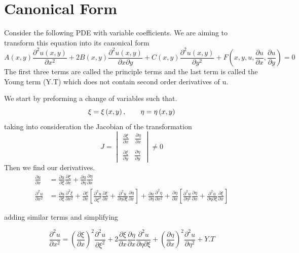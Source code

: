 \documentclass[]{article}
\begin{document}
\section{Canonical Form}
Consider the following PDE with variable coefficients. We are aiming to transform this equation into its canonical form
\begin{equation}
A\left(x,y\right)\frac{\partial^2 u\left(x,y\right)}{\partial x^2} + 2B\left(x,y\right)\frac{\partial^2 u\left(x,y\right)}{\partial x\partial y}+C\left(x,y\right)\frac{\partial^2 u\left(x,y\right)}{\partial y^2}+F\left(x,y,u,\frac{\partial u}{\partial x},\frac{\partial u}{\partial y}\right) = 0
\end{equation}
The first three terms are called the principle terms and the last term is called the Young term (Y.T) which does not contain second order derivatives of u.
\par
We start by preforming a change of variables such that.
\[
    \xi = \xi\left(x,y\right),\quad\quad \eta = \eta\left(x,y\right)    
\]
taking into consideration the Jacobian of the transformation
\[
    J =\begin{vmatrix} \frac{\partial\xi}{\partial x}  \;\;\; \frac{\partial\eta}{\partial x} \\ \\ \frac{\partial\xi}{\partial y}\;\;\; \frac{\partial\eta}{\partial y} \end{vmatrix} \neq 0    
\]
Then we find our derivatives.
\begin{align*}
\frac{\partial u}{\partial x} &= \frac{\partial u}{\partial\xi}\frac{\partial\xi}{\partial x}+\frac{\partial u}{\partial\eta}\frac{\partial\eta}{\partial x}
\\
\frac{\partial^2 u}{\partial x^2} &= \frac{\partial u}{\partial\xi}\frac{\partial^2\xi}{\partial x^2}+\frac{\partial\xi}{\partial x}\left[\frac{\partial^2 u}{\partial\xi^2}\frac{\partial\xi}{\partial x}+\frac{\partial^2 u}{\partial\eta\partial\xi}\frac{\partial\eta}{\partial x}\right]+\frac{\partial u}{\partial\eta}\frac{\partial^2\eta}{\partial x^2}+\frac{\partial\eta}{\partial x}\left[\frac{\partial^2 u}{\partial\eta^2}\frac{\partial\eta}{\partial x}+\frac{\partial^2 u}{\partial\eta\partial\xi}\frac{\partial\xi}{\partial x}\right]
\end{align*}

adding similar terms and simplifying

\begin{equation}
\frac{\partial^2 u}{\partial x^2} = {(\frac{\partial\xi}{\partial x})}^2\frac{\partial^2 u}{\partial\xi^2}+2\frac{\partial\xi}{\partial x}\frac{\partial\eta}{\partial x}\frac{\partial^2 u}{\partial\eta\partial\xi}+{(\frac{\partial\eta}{\partial x})}^2\frac{\partial^2 u}{\partial\eta^2}+Y.T
\end{equation}
\end{document}
